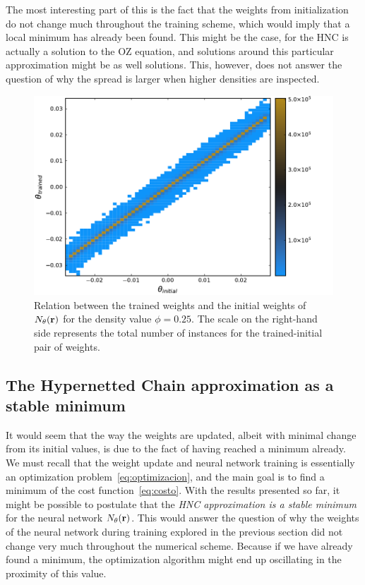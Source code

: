 The most interesting part of this is the fact that the weights from initialization
do not change much throughout the training scheme, which would imply that a local minimum
has already been found. This might be the case, for the HNC is actually a solution to
the OZ equation, and solutions around this particular approximation might be as well 
solutions. This, however, does not answer the question of why the spread is larger when
higher densities are inspected.

\begin{figure}
    \includegraphics[width=\textwidth]{figuras/capitulo-3/weights_phi=0.25.pdf}
    \caption[Comparison between weights, $\phi=0.25$.]{Relation between the trained weights and the initial weights of $N_{\theta}(\mathbf{r})$ for the density value $\phi=0.25$. The scale on the right-hand side represents the total number of instances for the trained-initial pair of weights.}
    \label{fig:pesos25}
\end{figure}

\subsection{The Hypernetted Chain approximation as a stable minimum}
It would seem that the way the weights are updated, albeit with minimal change from its
initial values, is due to the fact of having reached a minimum already.
We must recall that the weight update and neural network training is essentially an
optimization problem~\eqref{eq:optimizacion}, and the main goal is to find a minimum
of the cost function~\eqref{eq:costo}. With the results presented so far, it might be
possible to postulate that the \emph{HNC approximation is a stable minimum} for the
neural network $N_{\theta}(\mathbf{r})$.
This would answer the question of why the weights of the neural network during training
explored in the previous section did not change very much throughout the numerical scheme.
Because if we have already found a minimum, the optimization algorithm might end up
oscillating in the proximity of this value.

